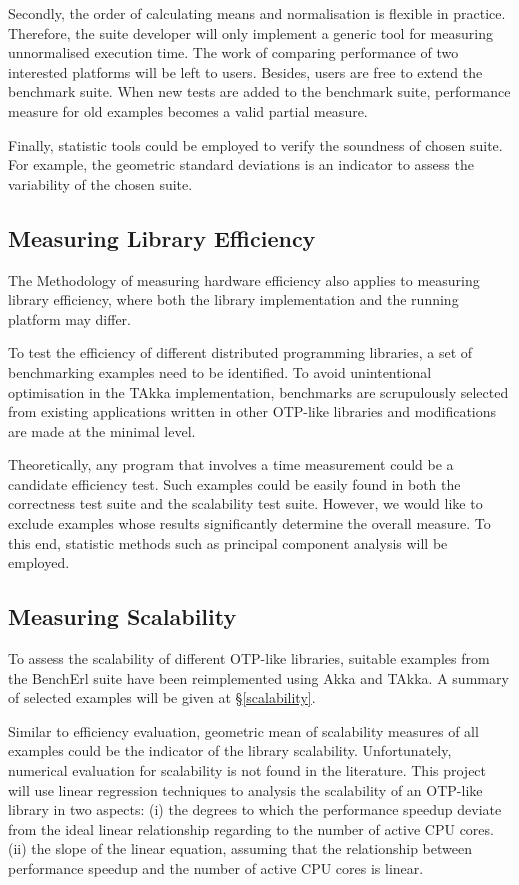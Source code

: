 Secondly, the order of calculating means and normalisation is flexible in practice.  Therefore, the suite developer will only implement a generic tool for measuring unnormalised execution time. The work of comparing performance of two interested platforms will be left to users.  Besides, users are free to extend the benchmark suite.  When new tests are added to the benchmark suite, performance measure for old examples becomes a valid partial measure.

Finally, statistic tools could be employed to verify the soundness of chosen suite.  For example, the geometric standard deviations is an indicator to assess the variability of the chosen suite.


\subsection{Measuring Library Efficiency}
The Methodology of measuring hardware efficiency also applies to measuring library efficiency, where both the library implementation and the running platform may differ.  

To test the efficiency of different distributed programming libraries, a set of benchmarking examples need to be identified.  To avoid unintentional optimisation in the TAkka implementation, benchmarks are scrupulously selected from existing applications written in other OTP-like libraries and modifications are made at the minimal level.  

Theoretically, any program that involves a time measurement could be a candidate efficiency test.  Such examples could be easily found in both the correctness test suite and the scalability test suite.  However, we would like to exclude examples whose results significantly determine the overall measure.  To this end, statistic methods such as principal component analysis will be employed.

\subsection{Measuring Scalability}

To assess the scalability of different OTP-like libraries, suitable examples from the BenchErl suite\cite{RELEASE} have been reimplemented using Akka and TAkka.  A summary of selected examples will be given at \S\ref{scalability}.

Similar to efficiency evaluation, geometric mean of scalability measures of all examples could be the indicator of the library scalability.  Unfortunately, numerical evaluation for scalability is not found in the literature.  This project will use linear regression techniques to analysis the scalability of an OTP-like library in two aspects: (i) the degrees to which the performance speedup deviate from the ideal linear relationship regarding to the number of active CPU cores.  (ii) the slope of the linear equation, assuming that the relationship between performance speedup and the number of active CPU cores is linear.

